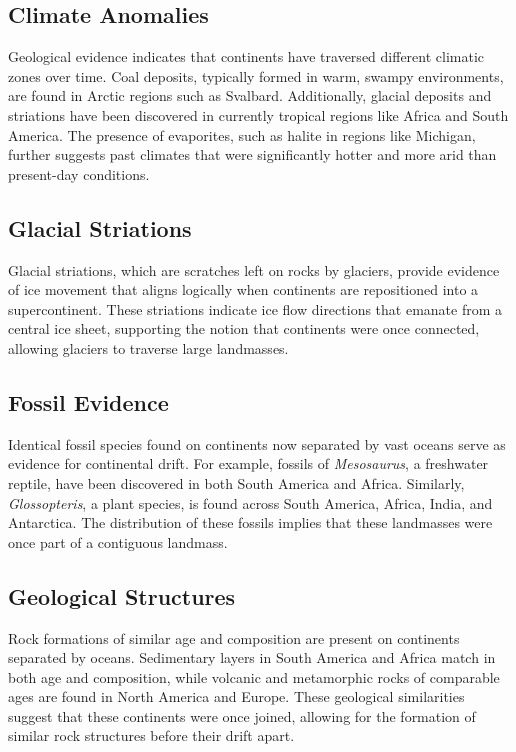 \documentclass{article}
\begin{document}
\subsection{Climate Anomalies}

Geological evidence indicates that continents have traversed different climatic zones over time. Coal deposits, typically formed in warm, swampy environments, are found in Arctic regions such as Svalbard. Additionally, glacial deposits and striations have been discovered in currently tropical regions like Africa and South America. The presence of evaporites, such as halite in regions like Michigan, further suggests past climates that were significantly hotter and more arid than present-day conditions.

\subsection{Glacial Striations}

Glacial striations, which are scratches left on rocks by glaciers, provide evidence of ice movement that aligns logically when continents are repositioned into a supercontinent. These striations indicate ice flow directions that emanate from a central ice sheet, supporting the notion that continents were once connected, allowing glaciers to traverse large landmasses.

\subsection{Fossil Evidence}

Identical fossil species found on continents now separated by vast oceans serve as evidence for continental drift. For example, fossils of \textit{Mesosaurus}, a freshwater reptile, have been discovered in both South America and Africa. Similarly, \textit{Glossopteris}, a plant species, is found across South America, Africa, India, and Antarctica. The distribution of these fossils implies that these landmasses were once part of a contiguous landmass.

\subsection{Geological Structures}

Rock formations of similar age and composition are present on continents separated by oceans. Sedimentary layers in South America and Africa match in both age and composition, while volcanic and metamorphic rocks of comparable ages are found in North America and Europe. These geological similarities suggest that these continents were once joined, allowing for the formation of similar rock structures before their drift apart.
\end{document}
